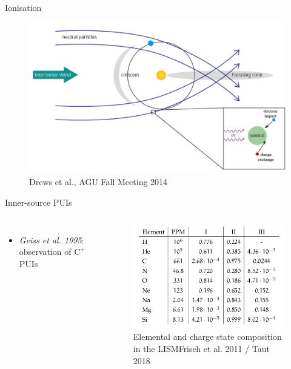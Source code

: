 \documentclass{beamer}
\begin{document}
\begin{frame}{Ionisation}
\begin{center}
\end{center}
\begin{figure}
	\includegraphics[scale=0.23]{pictures/i_processes_1.png}
	\caption{\tiny{Drews et al., AGU Fall Meeting 2014}}
\end{figure}
\end{frame}
\begin{frame}{Inner-source PUIs} %
	\begin{columns}
	\column{5cm}
	\begin{itemize}
		\item \textit{Geiss et al. 1995}: observation of $\mathrm{C^+}$ PUIs
		\vspace{5.0cm}
	\end{itemize}
	\column{6cm}
		\begin{minipage}{5cm}
		\begin{figure}
			\includegraphics[scale=0.3]{pictures/lism_table.png}
			
			\caption{\scriptsize{Elemental and charge state composition in the LISM\newline Frisch et al. 2011 /  Taut 2018}}
		\end{figure}
		\end{minipage}
	\end{columns}
\end{frame}
\end{document}
